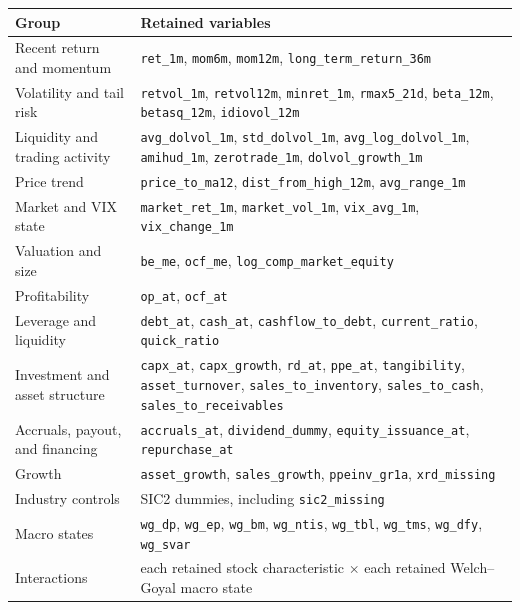 \documentclass[11pt,a4paper]{article}
\newcommand{\code}[1]{\texttt{#1}}
\begin{document}
\begin{center}
\begin{tabularx}{\textwidth}{p{3.8cm}Y}
\toprule
Group & Retained variables \\
\midrule
Recent return and momentum & \code{ret\_1m}, \code{mom6m}, \code{mom12m}, \code{long\_term\_return\_36m} \\
Volatility and tail risk & \code{retvol\_1m}, \code{retvol12m}, \code{minret\_1m}, \code{rmax5\_21d}, \code{beta\_12m}, \code{betasq\_12m}, \code{idiovol\_12m} \\
Liquidity and trading activity & \code{avg\_dolvol\_1m}, \code{std\_dolvol\_1m}, \code{avg\_log\_dolvol\_1m}, \code{amihud\_1m}, \code{zerotrade\_1m}, \code{dolvol\_growth\_1m} \\
Price trend & \code{price\_to\_ma12}, \code{dist\_from\_high\_12m}, \code{avg\_range\_1m} \\
Market and VIX state & \code{market\_ret\_1m}, \code{market\_vol\_1m}, \code{vix\_avg\_1m}, \code{vix\_change\_1m} \\
Valuation and size & \code{be\_me}, \code{ocf\_me}, \code{log\_comp\_market\_equity} \\
Profitability & \code{op\_at}, \code{ocf\_at} \\
Leverage and liquidity & \code{debt\_at}, \code{cash\_at}, \code{cashflow\_to\_debt}, \code{current\_ratio}, \code{quick\_ratio} \\
Investment and asset structure & \code{capx\_at}, \code{capx\_growth}, \code{rd\_at}, \code{ppe\_at}, \code{tangibility}, \code{asset\_turnover}, \code{sales\_to\_inventory}, \code{sales\_to\_cash}, \code{sales\_to\_receivables} \\
Accruals, payout, and financing & \code{accruals\_at}, \code{dividend\_dummy}, \code{equity\_issuance\_at}, \code{repurchase\_at} \\
Growth & \code{asset\_growth}, \code{sales\_growth}, \code{ppeinv\_gr1a}, \code{xrd\_missing} \\
Industry controls & SIC2 dummies, including \code{sic2\_missing} \\
Macro states & \code{wg\_dp}, \code{wg\_ep}, \code{wg\_bm}, \code{wg\_ntis}, \code{wg\_tbl}, \code{wg\_tms}, \code{wg\_dfy}, \code{wg\_svar} \\
Interactions & each retained stock characteristic $\times$ each retained Welch--Goyal macro state \\
\bottomrule
\end{tabularx}
\end{center}
\end{document}
